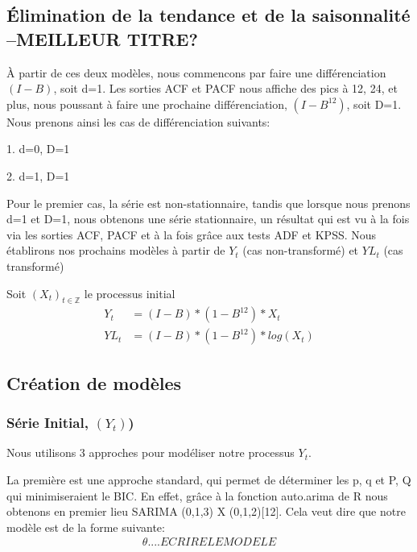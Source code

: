 \documentclass[12pt,a4paper]{book}
\newcommand{\1}{\mathds{1}}
\begin{document}
\vspace{5 mm}
\subsection{Élimination de la tendance et de la saisonnalité --MEILLEUR TITRE?}

\vspace{5 mm}
À partir de ces deux modèles, nous commencons par faire une différenciation $(I-B)$, soit d=1. Les sorties ACF et PACF nous affiche des pics à 12, 24, et plus, nous poussant à faire une prochaine différenciation, $(I-B^{12})$, soit D=1. Nous prenons ainsi les cas de différenciation suivants:
\begin{description}
  \item 1. d=0, D=1
  \item 2. d=1, D=1
\end{description}
\noindent 
Pour le premier cas, la série est non-stationnaire, tandis que lorsque nous prenons d=1 et D=1, nous obtenons une série stationnaire, un résultat qui est vu à la fois via les sorties ACF, PACF et à la fois grâce aux tests ADF et KPSS. Nous établirons nos prochains modèles à partir de $Y_t$ (cas non-transformé) et $YL_t$ (cas transformé)

\noindent 
Soit $(X_t)_{t\in \mathbb{Z}}$ le processus initial
\begin{align*}
Y_t &= (I-B) * (1-B^{12}) * X_t \\ 
YL_t &= (I-B) * (1-B^{12}) * log(X_t)
\end{align*}



\vspace{5 mm}
\subsection{Création de modèles}

\vspace{5 mm}
\subsubsection{Série Initial, $(Y_t)$)}

Nous utilisons 3 approches pour modéliser notre processus $Y_t$.

La première est une approche standard, qui permet de déterminer les p, q et P, Q qui minimiseraient le BIC. En effet, grâce à la fonction auto.arima de R nous obtenons en premier lieu SARIMA (0,1,3) X (0,1,2)[12]. Cela veut dire que notre modèle est de la forme suivante:
\begin{align*}
\theta ....ECRIRE LE MODELE
\end{align*}
\end{document}
